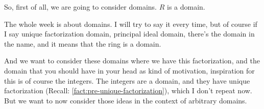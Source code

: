 \begin{speech}[00:05:18 - 00:06:03]
So, first of all, we are going to consider domains.  $R$ is a domain.

The whole week is about domains. I will try to say it every time, but of course if I say unique factorization domain, principal ideal domain, there's the domain in the name, and it means that the ring is a domain.

And we want to consider these domains where we have this factorization, and the domain that you should have in your head as kind of motivation, inspiration for this is of course the integers. The integers are a domain, and they have unique factorization (Recall: \cref{fact:pre-unique-factorization}), which I don't repeat now. But we want to now consider those ideas in the context of arbitrary domains.
\end{speech}

\begin{content}
\end{content}

